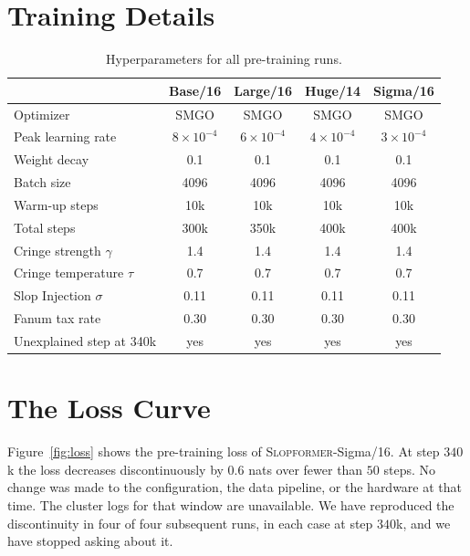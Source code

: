 \documentclass[10pt]{article}
\newcommand{\slop}{\textsc{Slopformer}}
\begin{document}
\clearpage
\appendix

\section{Training Details}
\label{app:hyper}

\begin{table}[h]
\centering
\caption{Hyperparameters for all pre-training runs.}
\small
\begin{tabular}{lcccc}
\toprule
 & Base/16 & Large/16 & Huge/14 & Sigma/16 \\
\midrule
Optimizer            & SMGO & SMGO & SMGO & SMGO \\
Peak learning rate   & $8\!\times\!10^{-4}$ & $6\!\times\!10^{-4}$ & $4\!\times\!10^{-4}$ & $3\!\times\!10^{-4}$ \\
Weight decay         & 0.1 & 0.1 & 0.1 & 0.1 \\
Batch size           & 4096 & 4096 & 4096 & 4096 \\
Warm-up steps        & 10k & 10k & 10k & 10k \\
Total steps          & 300k & 350k & 400k & 400k \\
Cringe strength $\gamma$ & 1.4 & 1.4 & 1.4 & 1.4 \\
Cringe temperature $\tau$ & 0.7 & 0.7 & 0.7 & 0.7 \\
Slop Injection $\sigma$  & 0.11 & 0.11 & 0.11 & 0.11 \\
Fanum tax rate           & 0.30 & 0.30 & 0.30 & 0.30 \\
Unexplained step at 340k & yes & yes & yes & yes \\
\bottomrule
\end{tabular}
\end{table}

\section{The Loss Curve}
\label{app:loss}

Figure~\ref{fig:loss} shows the pre-training loss of \slop{}-Sigma/16. At step
$340$k the loss decreases discontinuously by $0.6$ nats over fewer than $50$
steps. No change was made to the configuration, the data pipeline, or the
hardware at that time. The cluster logs for that window are unavailable. We
have reproduced the discontinuity in four of four subsequent runs, in each case
at step $340$k, and we have stopped asking about it.
\end{document}
